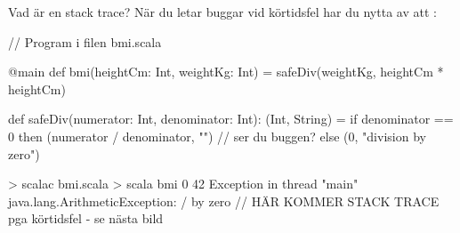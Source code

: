 \begin{Slide}{Vad är en stack trace?}\SlideFontSmall
När du letar buggar vid körtidsfel har du nytta av att   :


  
\begin{Code}[numbers=left]
// Program i filen bmi.scala

@main 
def bmi(heightCm: Int, weightKg: Int) = 
  safeDiv(weightKg, heightCm * heightCm) 

def safeDiv(numerator: Int, denominator: Int): (Int, String) = 
  if denominator == 0 then (numerator / denominator, "")  // ser du buggen?
  else (0, "division by zero")

\end{Code}
\begin{REPL}
> scalac bmi.scala 
> scala bmi 0 42
Exception in thread "main" java.lang.ArithmeticException: / by zero
        // HÄR KOMMER STACK TRACE pga körtidsfel - se nästa bild
\end{REPL}
\end{Slide}

